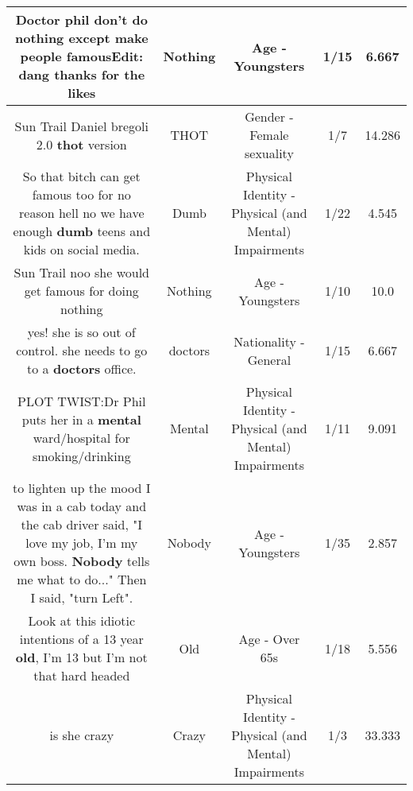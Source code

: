 \documentclass[11pt]{article}
\newlength\mylength
\begin{document}
\begin{center}
\begin{longtable}{|C{.65\mylength}|C{.30\mylength}|C{.12\mylength}|C{.12\mylength}|C{.12\mylength}|}
  \small Doctor phil don't do \textbf{nothing} except make people famousEdit: dang thanks for the likes\normalsize   & Nothing & Age - Youngsters & 1/15 & 6.667 \\  \hline
  \small Sun Trail Daniel bregoli 2.0 \textbf{thot} version\normalsize   & THOT & Gender - Female sexuality & 1/7 & 14.286 \\  \hline
  \small So that bitch can get famous too for no reason  hell no we have enough \textbf{dumb} teens and kids on social media.\normalsize   & Dumb & Physical Identity - Physical (and Mental) Impairments & 1/22 & 4.545 \\  \hline
  \small Sun Trail noo she would get famous for doing nothing\normalsize   & Nothing & Age - Youngsters & 1/10 & 10.0 \\  \hline
  \small yes! she is so out of control. she needs to go to a \textbf{doctors} office.\normalsize   & doctors & Nationality - General & 1/15 & 6.667 \\  \hline
  \small PLOT TWIST:Dr Phil puts her in a \textbf{mental} ward/hospital for smoking/drinking\normalsize   & Mental & Physical Identity - Physical (and Mental) Impairments & 1/11 & 9.091 \\  \hline
  \small to lighten up the mood I was in a cab today and the cab driver said, "I love my job, I'm my own boss. \textbf{Nobody} tells me what to do..." Then I said, "turn Left".\normalsize   & Nobody & Age - Youngsters & 1/35 & 2.857 \\  \hline
  \small Look at this idiotic intentions of a 13 year \textbf{old}, I'm 13 but I'm not that hard headed\normalsize   & Old & Age - Over 65s & 1/18 & 5.556 \\  \hline
  \small is she crazy\normalsize   & Crazy & Physical Identity - Physical (and Mental) Impairments & 1/3 & 33.333 \\  \hline

\end{longtable}
\end{center}
\end{document}
